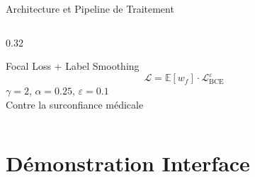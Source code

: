 \documentclass[aspectratio=169, 12pt, compress]{beamer}
\begin{document}
\begin{frame}{Architecture et Pipeline de Traitement}
\begin{columns}[T]
    \begin{column}{0.32\textwidth}
      \begin{block}{Focal Loss + Label Smoothing}
        \[
          \mathcal{L} = \mathbb{E}[w_f]\cdot\mathcal{L}_{\text{BCE}}^{\varepsilon}
        \]
        \small $\gamma=2$, $\alpha=0.25$, $\varepsilon=0.1$\\
        Contre la surconfiance médicale
      \end{block}
    \end{column}

  \end{columns}

  \vspace{4pt}
  \begin{center}
  \end{center}

\end{frame}

\section{Démonstration Interface}
\end{document}
